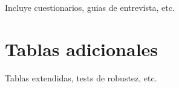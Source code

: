 \documentclass[
  a4paper,
  oneside]{scrbook}
\begin{document}
Incluye cuestionarios, guias de entrevista, etc.

\chapter{Tablas adicionales}\label{tablas-adicionales}

Tablas extendidas, tests de robustez, etc.


\backmatter

\mainmatter
\pagestyle{scrheadings}

\end{document}
